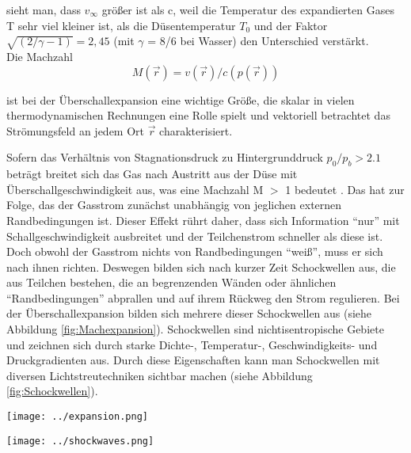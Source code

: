 sieht man, dass $v_{\infty}$ größer ist als c, weil die Temperatur des expandierten Gases T sehr viel kleiner ist, als die Düsentemperatur $T_0$ und der Faktor $\sqrt{(2/\gamma -1)}=2,45$ (mit $\gamma$ = 8/6 bei Wasser) den Unterschied verstärkt.\\
Die Machzahl 
\begin{equation}
M(\vec{r})= v(\vec{r})/c(p(\vec{r}))
\end{equation}

ist bei der Überschallexpansion eine wichtige Größe, die skalar in vielen thermodynamischen Rechnungen eine Rolle spielt und vektoriell betrachtet das Strömungsfeld an jedem Ort $\vec{r}$ charakterisiert. 

Sofern das Verhältnis von Stagnationsdruck zu Hintergrunddruck $p_0/p_b > 2.1$ beträgt breitet sich das Gas nach Austritt aus der Düse mit Überschallgeschwindigkeit aus, was eine Machzahl M $>$ 1 bedeutet \cite{scoles1988}. Das hat zur Folge, das der Gasstrom zunächst unabhängig von jeglichen externen Randbedingungen ist. Dieser Effekt rührt daher, dass sich Information \enquote{nur} mit Schallgeschwindigkeit ausbreitet und der Teilchenstrom schneller als diese ist. Doch obwohl der Gasstrom nichts von Randbedingungen \enquote{weiß}, muss er sich nach ihnen richten. Deswegen bilden sich nach kurzer Zeit Schockwellen aus, die aus Teilchen bestehen, die an begrenzenden Wänden oder ähnlichen \enquote{Randbedingungen} abprallen und auf ihrem Rückweg den Strom regulieren. Bei der Überschallexpansion bilden sich mehrere dieser Schockwellen aus (siehe Abbildung \ref{fig:Machexpansion}). Schockwellen sind nichtisentropische Gebiete und zeichnen sich durch starke Dichte-, Temperatur-, Geschwindigkeits- und Druckgradienten aus. Durch diese Eigenschaften kann man Schockwellen mit diversen Lichtstreutechniken sichtbar machen \cite{Mou09} (siehe Abbildung \ref{fig:Schockwellen}).
%
\begin{center}
\begin{minipage}{\linewidth}
\centering
\texttt{[image: ../expansion.png]}%
 \label{fig:Machexpansion}
\end{minipage} 
\end{center} 
%
\begin{center}
\begin{minipage}{\linewidth}
\centering
\texttt{[image: ../shockwaves.png]}%
 \label{fig:Schockwellen}
\end{minipage} 
\end{center} 

